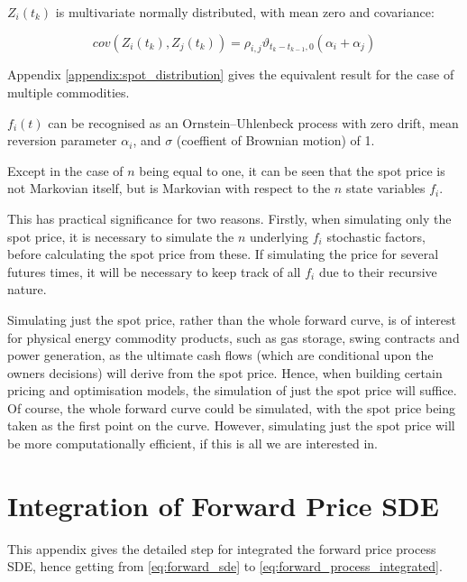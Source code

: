 \documentclass{article}
\begin{document}
$Z_i(t_k)$ is multivariate normally distributed, with mean zero and covariance:

\begin{equation}
    cov(Z_i(t_k), Z_j(t_k)) = \rho_{i, j} \vartheta_{t_k-t_{k-1}, 0}(\alpha_i + \alpha_j)
\end{equation}

Appendix \ref{appendix:spot_distribution} gives the equivalent result for the case
of multiple commodities.

\bigskip

$f_i(t)$ can be recognised as an Ornstein–Uhlenbeck process with zero drift,
mean reversion parameter $\alpha_i$, and $\sigma$ (coeffient of Brownian motion) of 1.

Except in the case of $n$ being equal to one, it can be seen %
that the spot price is not Markovian itself, but is Markovian with respect to the
$n$ state variables $f_i$.


This has practical significance for two reasons. Firstly, when simulating only the 
spot price, it is necessary to simulate the $n$ underlying $f_i$ stochastic factors,
before calculating the spot price from these. If simulating the price for several
futures times, it will be necessary to keep track of all $f_i$ due to their
recursive nature.


Simulating just the spot price, rather than the whole forward curve, is of interest
for physical energy commodity products, such as gas storage, swing contracts
and power generation, as the ultimate cash flows (which are conditional upon the
owners decisions) will derive from the spot price. Hence, when building certain pricing 
and optimisation models, the simulation of just the spot price will suffice.
Of course, the whole forward curve could be simulated, with the spot price being taken
as the first point on the curve. However, simulating just the spot price will be 
more computationally efficient, if this is all we are interested in.

\newpage
\appendix
\appendixpage
\section{Integration of Forward Price SDE}
\label{appendix:forward_sde_integrate}
This appendix gives the detailed step for integrated the forward price process
SDE, hence getting from \ref{eq:forward_sde} to \ref{eq:forward_process_integrated}.
\end{document}
